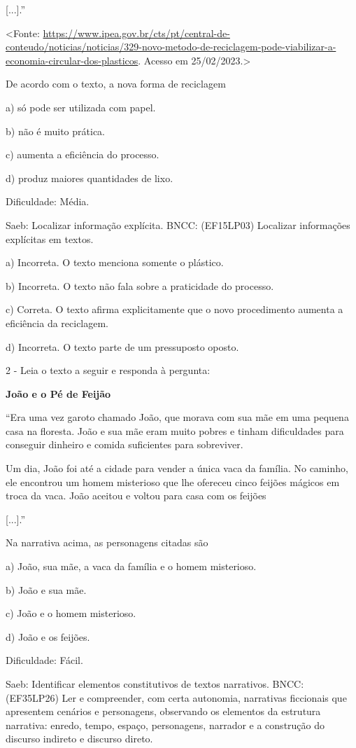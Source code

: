 {[}...{]}.''

\textless{}Fonte:
\url{https://www.ipea.gov.br/cts/pt/central-de-conteudo/noticias/noticias/329-novo-metodo-de-reciclagem-pode-viabilizar-a-economia-circular-dos-plasticos}.
Acesso em 25/02/2023.\textgreater{}

De acordo com o texto, a nova forma de reciclagem

a) só pode ser utilizada com papel.

b) não é muito prática.

c) aumenta a eficiência do processo.

d) produz maiores quantidades de lixo.

Dificuldade: Média.

Saeb: Localizar informação explícita. BNCC: (EF15LP03) Localizar
informações explícitas em textos.

a) Incorreta. O texto menciona somente o plástico.

b) Incorreta. O texto não fala sobre a praticidade do processo.

c) Correta. O texto afirma explicitamente que o novo procedimento
aumenta a eficiência da reciclagem.

d) Incorreta. O texto parte de um pressuposto oposto.

2 - Leia o texto a seguir e responda à pergunta:

\textbf{João e o Pé de Feijão}

``Era uma vez garoto chamado João, que morava com sua mãe em uma pequena
casa na floresta. João e sua mãe eram muito pobres e tinham dificuldades
para conseguir dinheiro e comida suficientes para sobreviver.

Um dia, João foi até a cidade para vender a única vaca da família. No
caminho, ele encontrou um homem misterioso que lhe ofereceu cinco
feijões mágicos em troca da vaca. João aceitou e voltou para casa com os
feijões

{[}...{]}.''

Na narrativa acima, as personagens citadas são

a) João, sua mãe, a vaca da família e o homem misterioso.

b) João e sua mãe.

c) João e o homem misterioso.

d) João e os feijões.

Dificuldade: Fácil.

Saeb: Identificar elementos constitutivos de textos narrativos. BNCC:
(EF35LP26) Ler e compreender, com certa autonomia, narrativas ficcionais
que apresentem cenários e personagens, observando os elementos da
estrutura narrativa: enredo, tempo, espaço, personagens, narrador e a
construção do discurso indireto e discurso direto.

